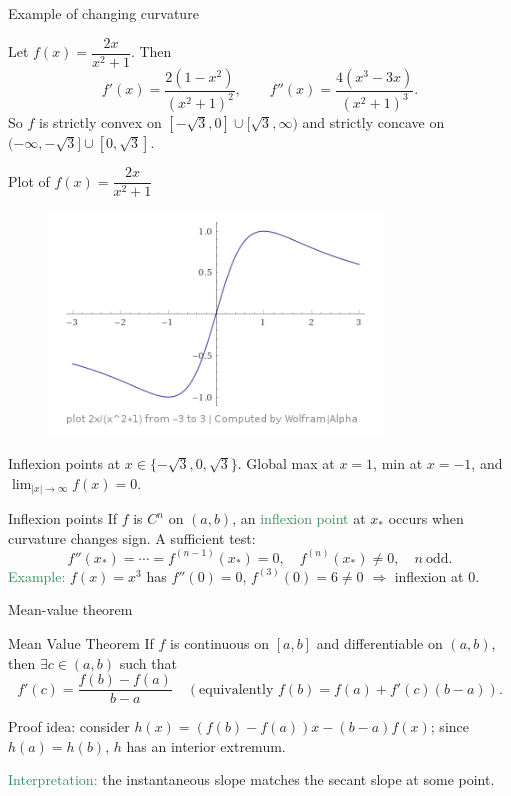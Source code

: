 \documentclass[11pt,aspectratio=169]{beamer}
\begin{document}
\begin{frame}{Example of changing curvature}

Let $f(x)=\dfrac{2x}{x^2+1}$. Then
\[
f'(x)=\frac{2(1-x^2)}{(x^2+1)^2},\qquad 
f''(x)=\frac{4(x^3-3x)}{(x^2+1)^3}.
\]
So $f$ is strictly convex on $[-\sqrt{3},0]\cup [\sqrt{3},\infty)$ and strictly concave on $(-\infty,-\sqrt{3}]\cup[0,\sqrt{3}]$.
\end{frame}

\begin{frame}{Plot of $f(x)=\dfrac{2x}{x^2+1}$}

\begin{figure}
\includegraphics[width=3.5in]{img/ima1} 
\end{figure}

Inflexion points at $x\in\{-\sqrt{3},0,\sqrt{3}\}$. Global max at $x=1$, min at $x=-1$, and $\lim_{|x|\to\infty} f(x)=0$.
\end{frame}

\begin{frame}{Inflexion points}
If $f$ is $C^n$ on $(a,b)$, an \textcolor{SeaGreen}{inflexion point} at $x_*$ occurs when curvature changes sign. A sufficient test: 
\[
f''(x_*)=\cdots=f^{(n-1)}(x_*)=0,\quad f^{(n)}(x_*)\ne 0,\quad n\ \text{odd}.
\]
\textcolor{SeaGreen}{Example:} $f(x)=x^3$ has $f''(0)=0$, $f^{(3)}(0)=6\ne 0$ $\Rightarrow$ inflexion at $0$.
\end{frame}


\begin{frame}[label=mv]{Mean-value theorem}
\begin{alertblock}{Mean Value Theorem}
If $f$ is continuous on $[a,b]$ and differentiable on $(a,b)$,
then $\exists c\in(a,b)$ such that
\[
f'(c)=\frac{f(b)-f(a)}{b-a}\quad(\text{equivalently } f(b)=f(a)+f'(c)(b-a)).
\]
\end{alertblock}
\begin{tiny}Proof idea: consider $h(x)=(f(b)-f(a))x-(b-a)f(x)$; since $h(a)=h(b)$, $h$ has an interior extremum.\end{tiny}
\bigskip

\textcolor{SeaGreen}{Interpretation:} the instantaneous slope matches the secant slope at some point.
\end{frame}
\end{document}
